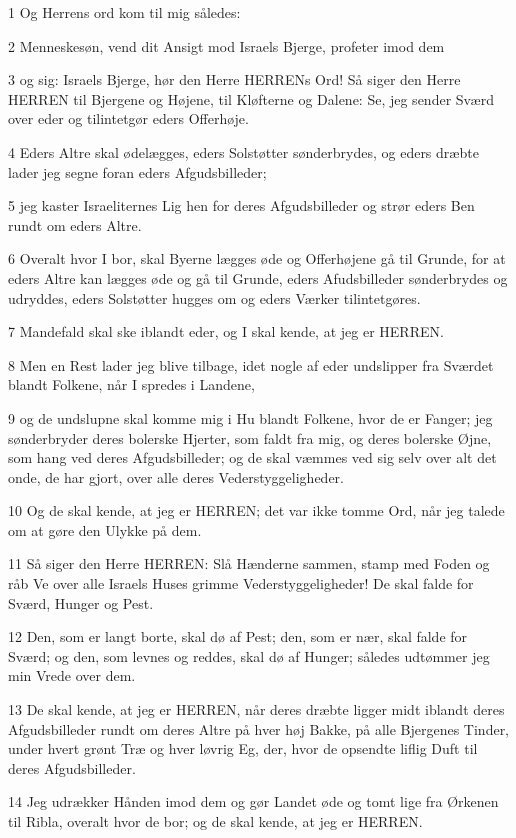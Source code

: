 \par 1 Og Herrens ord kom til mig således:
\par 2 Menneskesøn, vend dit Ansigt mod Israels Bjerge, profeter imod dem
\par 3 og sig: Israels Bjerge, hør den Herre HERRENs Ord! Så siger den Herre HERREN til Bjergene og Højene, til Kløfterne og Dalene: Se, jeg sender Sværd over eder og tilintetgør eders Offerhøje.
\par 4 Eders Altre skal ødelægges, eders Solstøtter sønderbrydes, og eders dræbte lader jeg segne foran eders Afgudsbilleder;
\par 5 jeg kaster Israeliternes Lig hen for deres Afgudsbilleder og strør eders Ben rundt om eders Altre.
\par 6 Overalt hvor I bor, skal Byerne lægges øde og Offerhøjene gå til Grunde, for at eders Altre kan lægges øde og gå til Grunde, eders Afudsbilleder sønderbrydes og udryddes, eders Solstøtter hugges om og eders Værker tilintetgøres.
\par 7 Mandefald skal ske iblandt eder, og I skal kende, at jeg er HERREN.
\par 8 Men en Rest lader jeg blive tilbage, idet nogle af eder undslipper fra Sværdet blandt Folkene, når I spredes i Landene,
\par 9 og de undslupne skal komme mig i Hu blandt Folkene, hvor de er Fanger; jeg sønderbryder deres bolerske Hjerter, som faldt fra mig, og deres bolerske Øjne, som hang ved deres Afgudsbilleder; og de skal væmmes ved sig selv over alt det onde, de har gjort, over alle deres Vederstyggeligheder.
\par 10 Og de skal kende, at jeg er HERREN; det var ikke tomme Ord, når jeg talede om at gøre den Ulykke på dem.
\par 11 Så siger den Herre HERREN: Slå Hænderne sammen, stamp med Foden og råb Ve over alle Israels Huses grimme Vederstyggeligheder! De skal falde for Sværd, Hunger og Pest.
\par 12 Den, som er langt borte, skal dø af Pest; den, som er nær, skal falde for Sværd; og den, som levnes og reddes, skal dø af Hunger; således udtømmer jeg min Vrede over dem.
\par 13 De skal kende, at jeg er HERREN, når deres dræbte ligger midt iblandt deres Afgudsbilleder rundt om deres Altre på hver høj Bakke, på alle Bjergenes Tinder, under hvert grønt Træ og hver løvrig Eg, der, hvor de opsendte liflig Duft til deres Afgudsbilleder.
\par 14 Jeg udrækker Hånden imod dem og gør Landet øde og tomt lige fra Ørkenen til Ribla, overalt hvor de bor; og de skal kende, at jeg er HERREN.


